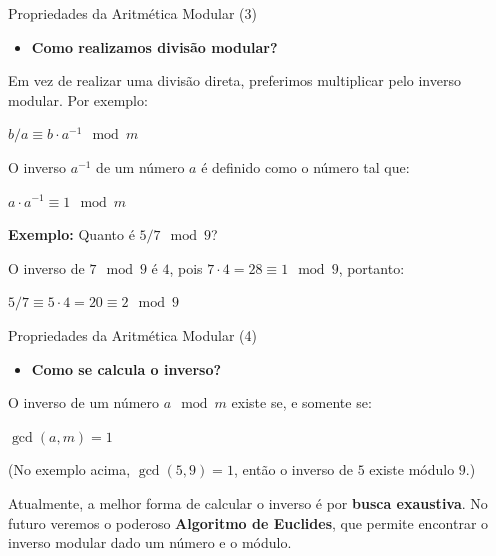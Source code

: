 \documentclass{beamer}
\begin{document}
\begin{frame}{Propriedades da Aritmética Modular (3)}
\begin{itemize}
    \item \textbf{Como realizamos divisão modular?}
\end{itemize}

Em vez de realizar uma divisão direta, preferimos multiplicar pelo inverso modular. Por exemplo:
\begin{center}
    $b / a \equiv b \cdot a^{-1} \mod m$    
\end{center}

O inverso $a^{-1}$ de um número $a$ é definido como o número tal que:
\begin{center}
    $a \cdot a^{-1} \equiv 1 \mod m$    
\end{center}

\textbf{Exemplo:} Quanto é $5 / 7 \mod 9$?

O inverso de $7 \mod 9$ é $4$, pois $7 \cdot 4 = 28 \equiv 1 \mod 9$, portanto:
\begin{center}
    $5 / 7 \equiv 5 \cdot 4 = 20 \equiv 2 \mod 9$    
\end{center}

\end{frame}

\begin{frame}{Propriedades da Aritmética Modular (4)}
\begin{itemize}
    \item \textbf{Como se calcula o inverso?}
\end{itemize}
O inverso de um número $a \mod m$ existe se, e somente se:
\begin{center}
    $\gcd(a, m) = 1$    
\end{center}

(No exemplo acima, $\gcd(5, 9) = 1$, então o inverso de $5$ existe módulo $9$.)

\footnotesize
Atualmente, a melhor forma de calcular o inverso é por \textbf{busca exaustiva}. No futuro veremos o poderoso \textbf{Algoritmo de Euclides}, que permite encontrar o inverso modular dado um número e o módulo.
\normalsize

\end{frame}
\end{document}
